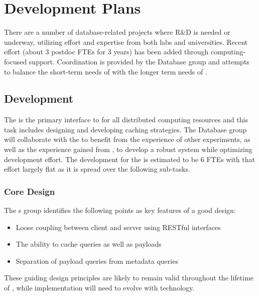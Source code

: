 \documentclass[../main-v1.tex]{subfiles}
\begin{document}
\section{Development Plans  }

There are a number of database-related projects where R\&D is needed or underway, utilizing effort and expertise from both  labs and universities. Recent effort (about 3 postdoc FTEs for 3 years) has been added through  computing-focused  support. Coordination is provided by the Database group and attempts to balance the short-term needs of  with the longer term needs of .

\subsection{ Development}
\label{sec:db:conddbdev}

The  is the primary interface to  for all  distributed computing resources and this task includes designing and developing caching strategies.  The  Database group will collaborate with the  to benefit from the experience of other  experiments, as well as the experience gained from , to develop a robust system while optimizing development effort.
The development for the  is estimated to be 6 FTEs with that effort largely flat as it is spread over the following sub-tasks.

\subsubsection{ Core Design}

The  s group identifies the following points as key features of a good  design:

\begin{itemize}
    \item    Loose coupling between client and server using RESTful interfaces
    \item    The ability to cache queries as well as payloads
    \item    Separation of payload queries from metadata queries
\end{itemize}

These guiding design principles are likely to remain valid throughout the lifetime of , while implementation will need to evolve with technology.
\end{document}
